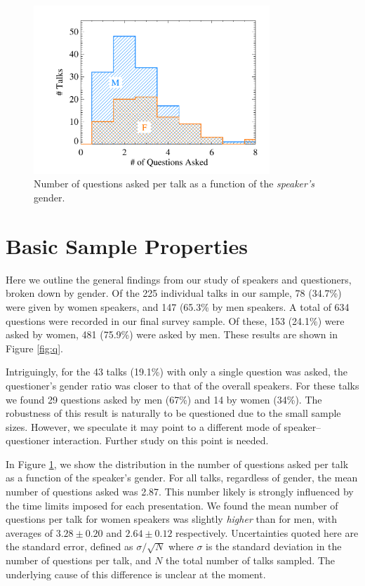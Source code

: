 \documentclass[iop]{emulateapj}
\begin{document}
\begin{figure}[!t]
\centering
\includegraphics[width=3.5in]{n_question_gender}
\caption{Number of questions asked per talk as a function of the {\it speaker's} gender.}
\label{fig:qhist}
\end{figure}


\section{Basic Sample Properties}
Here we outline the general findings from our study of speakers and questioners, broken down by gender.  
Of the 225 individual talks in our sample, 78 (34.7\%) were given by women speakers, and 147 (65.3\% by men speakers. A total of 634 questions were recorded in our final survey sample. Of these, 153 (24.1\%) were asked by women, 481 (75.9\%) were asked by men. These results are shown in Figure \ref{fig:q}.


Intriguingly, for the 43 talks (19.1\%) with only a single question was asked, the questioner's gender ratio was closer to that of the overall speakers. For these talks we found 29 questions asked by men (67\%) and 14 by women (34\%). The robustness of this result is naturally to be questioned due to the small sample sizes. However, we speculate it may point to a different mode of speaker--questioner interaction. Further study on this point is needed.



In Figure \ref{fig:qhist}, we show the distribution in the number of questions asked per talk as a function of the speaker's gender. For all talks, regardless of gender, the mean number of questions asked was 2.87. This number likely is strongly influenced by the time limits imposed for each presentation. We found the mean number of questions per talk for women speakers was slightly {\it higher} than for men, with averages of $3.28 \pm 0.20$ and $2.64\pm0.12$ respectively. Uncertainties quoted here are the standard error, defined as $\sigma/\sqrt{N}$ where $\sigma$ is the standard deviation in the number of questions per talk, and $N$ the total number of talks sampled. The underlying cause of this difference is unclear at the moment.
\end{document}
